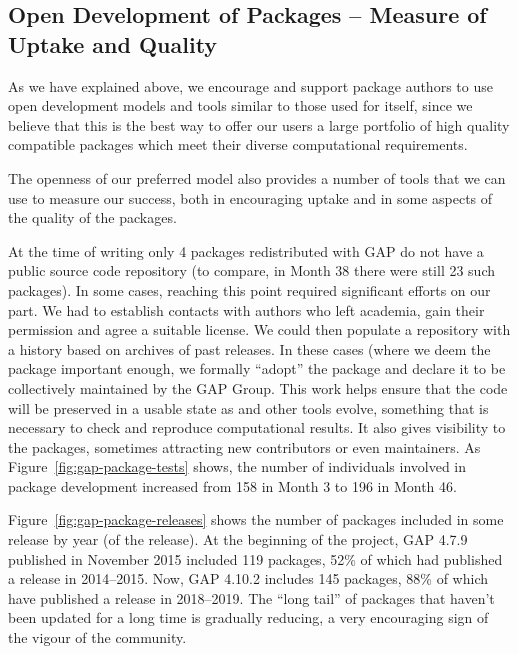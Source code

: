 \subsection{Open Development of \GAP Packages -- Measure of Uptake
  and Quality}\label{sec:uptake}

As we have explained above, we encourage and support package authors
to use open development models and tools similar to those used for
\GAP itself, since we believe that this is the best way to offer our
users a large portfolio of high quality compatible packages
which meet their diverse computational requirements.

The openness of our preferred model also provides a number of tools
that we can use to measure our success, both in encouraging uptake and
in some aspects of the quality of the packages.

At the time of writing only 4 packages redistributed with GAP do not
have a public source code repository (to compare, in Month 38 there
were still 23 such packages). In some cases, reaching this point required significant
efforts on our part. We had to establish contacts with authors who left
academia, gain their permission and agree a suitable license. We could 
then populate a repository with a history based on archives of
past releases. In these cases (where we deem the package important
enough,  we formally ``adopt'' the package and declare it to be collectively maintained
by the GAP Group. This work helps ensure that the code will be
preserved in a usable state as \GAP and other tools evolve, something
that is
necessary to check and reproduce computational results. It also gives
visibility to the packages, sometimes attracting new contributors or
even maintainers. As
Figure~\ref{fig:gap-package-tests} shows, the number of individuals
involved in package development increased from 158 in Month 3 to 196
in Month 46.

Figure~\ref{fig:gap-package-releases} shows the number of \GAP packages
included in some \GAP release by year (of the release).
At the beginning of the project, GAP 4.7.9 published in November
2015 included 119 packages, 52\% of which had published a release in 2014--2015.
Now, GAP 4.10.2 includes 145 packages, 88\% of which have published a
release in 2018--2019. The ``long tail'' of packages that haven't been updated for
a long time is gradually reducing, a very encouraging sign of the
vigour of the community.


